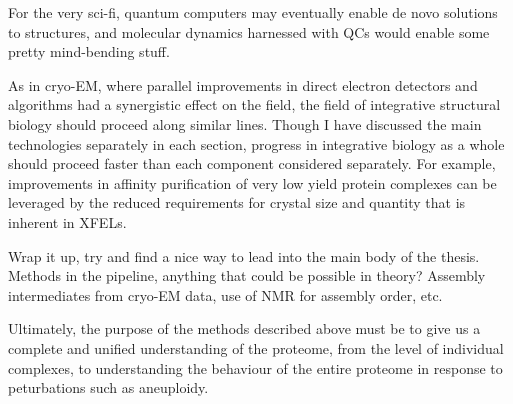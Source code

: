 \documentclass[a4paper,11pt,twoside,openright]{scrbook}
\begin{document}
For the very sci-fi, quantum computers may eventually enable de novo solutions to structures, and molecular dynamics harnessed with QCs would enable some pretty mind-bending stuff.

As in cryo-EM, where parallel improvements in direct electron detectors and algorithms had a synergistic effect on the field, the field of integrative structural biology should proceed along similar lines. Though I have discussed the main technologies separately in each section, progress in integrative biology as a whole should proceed faster than each component considered separately. For example, improvements in affinity purification of very low yield protein complexes can be leveraged by the reduced requirements for crystal size and quantity that is inherent in XFELs.

Wrap it up, try and find a nice way to lead into the main body of the thesis. Methods in the pipeline, anything that could be possible in theory? Assembly intermediates from cryo-EM data, use of NMR for assembly order, etc.


Ultimately, the purpose of the methods described above must be to give us a complete and unified understanding of the proteome, from the level of individual complexes, to understanding the behaviour of the entire proteome in response to peturbations such as aneuploidy.

\printbibliography
\end{document}
